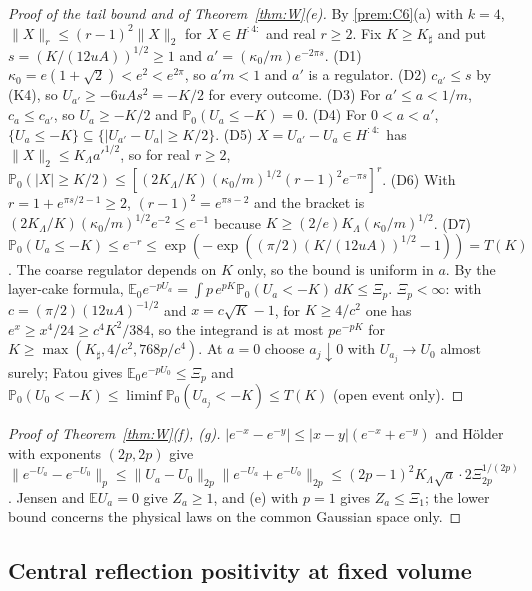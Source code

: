\documentclass[11pt]{article}
\theoremstyle{plain}
\theoremstyle{definition}
\theoremstyle{remark}
\newcommand{\E}{\mathbb{E}}
\newcommand{\PP}{\mathbb{P}}
\begin{document}
\begin{proof}[Proof of the tail bound and of Theorem~\ref{thm:W}(e)]
By \ref{prem:C6}(a) with $k=4$, $\|X\|_r\le(r-1)^{2}\|X\|_2$ for $X\in H^{{:}4{:}}$ and real $r\ge2$. Fix
$K\ge K_\sharp$ and put $s=(K/(12uA))^{1/2}\ge1$ and $a'=(\kappa_0/m)e^{-2\pi s}$.
(D1) $\kappa_0=e(1+\sqrt2)<e^{2}<e^{2\pi}$, so $a'm<1$ and $a'$ is a regulator.
(D2) $c_{a'}\le s$ by (K4), so $U_{a'}\ge-6uAs^{2}=-K/2$ for every outcome.
(D3) For $a'\le a<1/m$, $c_a\le c_{a'}$, so $U_a\ge-K/2$ and $\PP_0(U_a\le-K)=0$.
(D4) For $0<a<a'$, $\{U_a\le-K\}\subseteq\{|U_{a'}-U_a|\ge K/2\}$.
(D5) $X=U_{a'}-U_a\in H^{{:}4{:}}$ has $\|X\|_2\le K_\Lambda a'^{1/2}$, so for real $r\ge2$,
$\PP_0(|X|\ge K/2)\le[(2K_\Lambda/K)(\kappa_0/m)^{1/2}(r-1)^{2}e^{-\pi s}]^{r}$.
(D6) With $r=1+e^{\pi s/2-1}\ge2$, $(r-1)^{2}=e^{\pi s-2}$ and the bracket is
$(2K_\Lambda/K)(\kappa_0/m)^{1/2}e^{-2}\le e^{-1}$ because $K\ge(2/e)K_\Lambda(\kappa_0/m)^{1/2}$.
(D7) $\PP_0(U_a\le-K)\le e^{-r}\le\exp(-\exp((\pi/2)(K/(12uA))^{1/2}-1))=T(K)$.
The coarse regulator depends on $K$ only, so the bound is uniform in $a$. By the
layer-cake formula, $\E_0e^{-pU_a}=\int p\,e^{pK}\PP_0(U_a<-K)\,dK\le\Xi_p$. $\Xi_p<\infty$: with
$c=(\pi/2)(12uA)^{-1/2}$ and $x=c\sqrt K-1$, for $K\ge4/c^{2}$ one has $e^{x}\ge x^{4}/24\ge c^{4}K^{2}/384$, so the
integrand is at most $pe^{-pK}$ for $K\ge\max(K_\sharp,4/c^{2},768p/c^{4})$. At $a=0$ choose $a_j\downarrow0$ with
$U_{a_j}\to U_0$ almost surely; Fatou gives $\E_0e^{-pU_0}\le\Xi_p$ and
$\PP_0(U_0<-K)\le\liminf\PP_0(U_{a_j}<-K)\le T(K)$ (open event only).
\end{proof}

\begin{proof}[Proof of Theorem~\ref{thm:W}(f), (g)]
$|e^{-x}-e^{-y}|\le|x-y|(e^{-x}+e^{-y})$ and H\"older with exponents $(2p,2p)$ give
$\|e^{-U_a}-e^{-U_0}\|_p\le\|U_a-U_0\|_{2p}\|e^{-U_a}+e^{-U_0}\|_{2p}\le(2p-1)^{2}K_\Lambda\sqrt a\cdot2\Xi_{2p}^{1/(2p)}$. Jensen and
$\E U_a=0$ give $Z_a\ge1$, and (e) with $p=1$ gives $Z_a\le\Xi_1$; the lower bound concerns
the physical laws on the common Gaussian space only.
\end{proof}

\subsection{Central reflection positivity at fixed volume}
\end{document}
